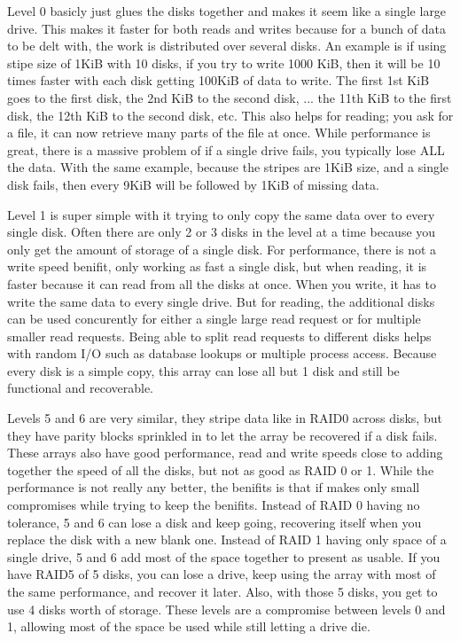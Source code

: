 \documentclass[12pt]{article}
\begin{document}
Level 0 basicly just glues the disks together and makes it seem like a single large drive.
This makes it faster for both reads and writes because for a bunch of data to be delt with, the work is distributed over several disks.
An example is if using stipe size of 1KiB with 10 disks, if you try to write 1000 KiB, then it will be 10 times faster with each disk getting 100KiB of data to write.
The first 1st KiB goes to the first disk, the 2nd KiB to the second disk, ... the 11th KiB to the first disk, the 12th KiB to the second disk, etc.
This also helps for reading; you ask for a file, it can now retrieve many parts of the file at once.
While performance is great, there is a massive problem of if a single drive fails, you typically lose ALL the data.
With the same example, because the stripes are 1KiB size, and a single disk fails, then every 9KiB will be followed by 1KiB of missing data.

Level 1 is super simple with it trying to only copy the same data over to every single disk.
Often there are only 2 or 3 disks in the level at a time because you only get the amount of storage of a single disk.
For performance, there is not a write speed benifit, only working as fast a single disk, but when reading, it is faster because it can read from all the disks at once.
When you write, it has to write the same data to every single drive.
But for reading, the additional disks can be used concurently for either a single large read request or for multiple smaller read requests.
Being able to split read requests to different disks helps with random I/O such as database lookups or multiple process access.
Because every disk is a simple copy, this array can lose all but 1 disk and still be functional and recoverable.

Levels 5 and 6 are very similar, they stripe data like in RAID0 across disks, but they have parity blocks sprinkled in to let the array be recovered if a disk fails.
These arrays also have good performance, read and write speeds close to adding together the speed of all the disks, but not as good as RAID 0 or 1.
While the performance is not really any better, the benifits is that if makes only small compromises while trying to keep the benifits.
Instead of RAID 0 having no tolerance, 5 and 6 can lose a disk and keep going, recovering itself when you replace the disk with a new blank one.
Instead of RAID 1 having only space of a single drive, 5 and 6 add most of the space together to present as usable.
If you have RAID5 of 5 disks, you can lose a drive, keep using the array with most of the same performance, and recover it later.
Also, with those 5 disks, you get to use 4 disks worth of storage.
These levels are a compromise between levels 0 and 1, allowing most of the space be used while still letting a drive die.
\end{document}
